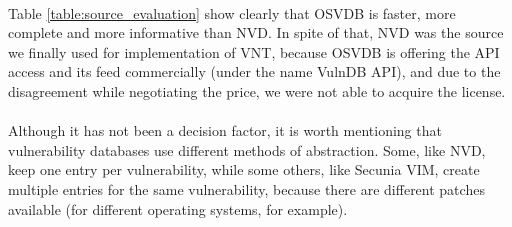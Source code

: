 \paragraph{}
Table \ref{table:source_evaluation} show clearly that OSVDB is faster, more complete and more informative than NVD. In spite of that, NVD was the source we finally used for implementation of VNT, because OSVDB is offering the API access and its feed commercially (under the name VulnDB API), and due to the disagreement while negotiating the price, we were not able to acquire the license.
\paragraph{}
Although it has not been a decision factor, it is worth mentioning that vulnerability databases use different methods of abstraction. Some, like NVD, keep one entry per vulnerability, while some others, like Secunia VIM, create multiple entries for the same vulnerability, because there are different patches available (for different operating systems, for example).



